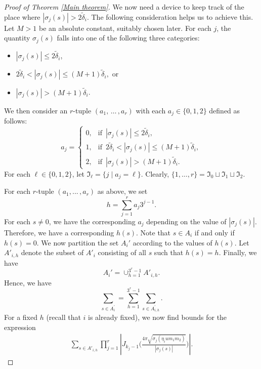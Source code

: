 \documentclass[reqno]{amsart}
\theoremstyle{plain}
\theoremstyle{definition}
\theoremstyle{remark}
\begin{document}
\begin{proof}[Proof of Theorem \ref{Main theorem}]
We now need a device to keep track of the place where $|\sigma_{j}(s)|> 2 \tilde{\delta}_i$. The following consideration helps us to achieve this. Let  $M>1$  be an absolute constant, suitably chosen later.  
For each $j$, the quantity $\sigma_j(s) $ falls into one of the following three categories: 
\begin{itemize}
     \item $ |\sigma_j(s)|\leq 2 \tilde{\delta}_i$,
    \item $ 2 \tilde{\delta}_i < |\sigma_{j}(s)|\leq (M+1) \tilde{\delta}_i,$ or
        \item $|\sigma_j(s)|> (M+1)\tilde{\delta}_i$.
\end{itemize}
   We then consider an $r$-tuple $(a_1,\,\dots \, , a_r) $ with each $a_j\in \{0,1,2\}$ defined as follows: 
\begin{equation}\label{aj}
 a_j=\begin{cases}
			0, & \text{if} \,\,\, |\sigma_j(s)|\leq 2 \tilde{\delta}_i,  \\
            1, & \text{if}   \,\, \, 2 \tilde{\delta}_i < |\sigma_{j}(s)|\leq (M+1) \tilde{\delta}_i, \\
            2, &  \text{if}\,\,\,  |\sigma_j(s)|> (M+1)\tilde{\delta}_i.
		 \end{cases}
\end{equation}
For each $\ell \in \{0, 1, 2\}$, let $\mathfrak{I}_\ell = \{ j \mid a_j = \ell \}$. Clearly, $\{1, \dots, r\} = \mathfrak{I}_0 \sqcup \mathfrak{I}_1 \sqcup \mathfrak{I}_2 $.

For each $r$-tuple $(a_1,...\, ,a_r)$ as above, we set 
\begin{equation}\label{h}
 h=\sum_{j=1}^r a_j 3^{j-1}. 
 \end{equation}
For each $s \neq 0$, we have the corresponding $a_j$ depending on the value of $|\sigma_j (s)|$. Therefore, we have a corresponding $h(s)$. Note that $s\in A_i$ if and only if $h(s)=0$. We now partition the set $A_i'$ according to the values of $h(s)$. Let $A'_{i,h}$ denote the subset of $A'_i$ consisting of all $s$ such that $h(s)=h$. Finally, we have 
$$
A_i'=\cup_{h=1}^{3^r-1}A'_{i,h}.
$$ 
Hence, we have 
\begin{equation}\label{eqn:Ai-prime-Ai-prime-h}
   \sum_{s \in A^\prime_i} = \sum_{h=1}^{3^r-1} \sum_{s \in A^\prime_{i,h}}. 
\end{equation}
  For a fixed $h$ (recall that $i$ is already fixed), we now find bounds for the expression   
\begin{align}\label{A'ih}
\sum_{s\in A'_{i,h} }    \prod_{j=1}^r\left| J_{k_j-1} \Big(  \frac{4 \pi\sqrt{\sigma_j (\eta_i u m_1m_2 )}}{|\sigma_j(s)|}\Big)\right|.
\end{align}




\end{proof}
\end{document}
